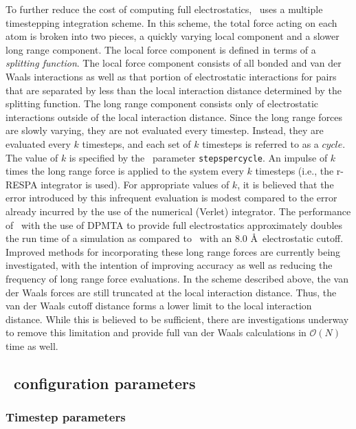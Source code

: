 To further reduce the cost of computing full electrostatics, 
\NAMD\ uses a multiple timestepping integration scheme.  In this scheme, 
the total force acting on each atom is broken into two pieces, a quickly varying local 
component and a slower long range component.  
The local force component is defined in terms of a {\it splitting function}.  The local force component consists of all bonded and van der Waals interactions
as well as that portion of electrostatic interactions for pairs that are separated by less than the local interaction distance determined by the splitting function.  
The long range component consists only of 
electrostatic interactions outside of the local interaction distance.
Since the long range forces are slowly varying, they are not evaluated
every timestep.  Instead, they are evaluated every $k$ timesteps, and
each set of $k$ timesteps is referred to as a $cycle$.
The value of $k$ is specified by the \NAMD\ parameter
\verb!stepspercycle!.  
An impulse of $k$ times the long range force is applied to the system
every $k$ timesteps (i.e., the r-RESPA integrator is used).
For appropriate values of $k$,
it is believed that the error introduced by this infrequent evaluation
is modest compared to the error already incurred by the use of the numerical
(Verlet) integrator.  
The performance of \NAMD\ with the use of DPMTA to provide 
full electrostatics approximately doubles the 
run time of a simulation as compared to \NAMD\ with an 
$8.0$ \AA\ electrostatic cutoff.  
Improved methods for incorporating these long range forces
are currently being investigated, 
with the intention of improving accuracy as well as 
reducing the frequency of long range force evaluations.  
\prettypar
In the scheme described above, the van der Waals forces are still 
truncated at the local interaction distance.  
Thus, the van der Waals cutoff distance 
forms a lower limit to the local interaction distance.  While this is
believed to be sufficient, there are investigations underway to remove
this limitation and provide full van der Waals calculations in 
${\mathcal O}(N)$ time as well.  


\subsection{\NAMD\ configuration parameters}
\label{section:config_basic}

\subsubsection{Timestep parameters}

